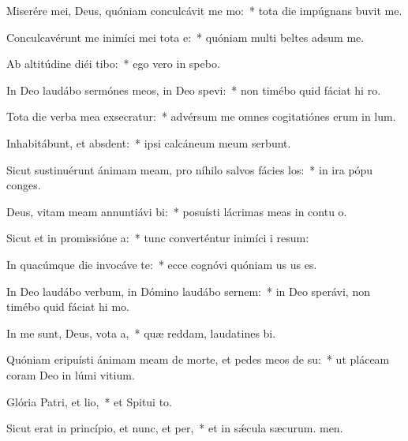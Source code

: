 \item Miserére mei, Deus, quóniam conculcávit me mo:~* tota die impúgnans buvit me.
\item Conculcavérunt me inimíci mei tota e:~* quóniam multi beltes adsum me.
\item Ab altitúdine diéi tibo:~* ego vero in  spebo.
\item In Deo laudábo sermónes meos, in Deo spevi:~* non timébo quid fáciat hi ro.
\item Tota die verba mea exsecratur:~* advérsum me omnes cogitatiónes erum in lum.
\item Inhabitábunt, et absdent:~* ipsi calcáneum meum serbunt.
\item Sicut sustinuérunt ánimam meam, pro níhilo salvos fácies los:~* in ira pópu conges.
\item Deus, vitam meam annuntiávi bi:~* posuísti lácrimas meas in contu o.
\item Sicut et in promissióne a:~* tunc converténtur inimíci i resum:
\item In quacúmque die invocáve te:~* ecce cognóvi quóniam us us es.
\item In Deo laudábo verbum, in Dómino laudábo sernem:~* in Deo sperávi, non timébo quid fáciat hi mo.
\item In me sunt, Deus, vota a,~* quæ reddam, laudatines bi.
\item Quóniam eripuísti ánimam meam de morte, et pedes meos de su:~* ut pláceam coram Deo in lúmi vitium.
\item Glória Patri, et lio,~* et Spitui to.
\item Sicut erat in princípio, et nunc, et per,~* et in sǽcula sæcurum. men.
